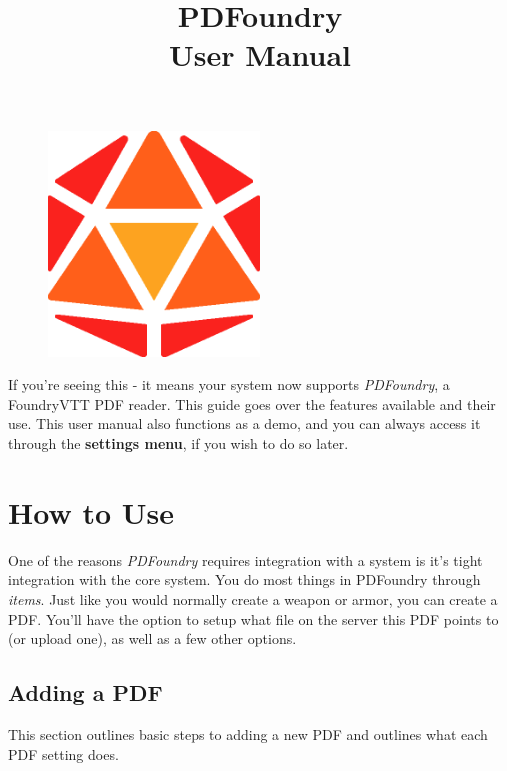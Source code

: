 \documentclass{article}
\title{%
PDFoundry \\
\large User Manual}
\date{}
\author{}
\begin{document}
    \begin{figure}[t]
        \centering
        \includegraphics[width=0.5\textwidth]{images/logo.png}
    \end{figure}
    \maketitle

    If you're seeing this - it means your system now supports \textit{PDFoundry}, a FoundryVTT PDF reader. This guide goes over the features available and their use. This user manual also functions as a demo, and you can always access it through the \textbf{settings menu}, if you wish to do so later.

    \tableofcontents

    \section{How to Use}
    One of the reasons \textit{PDFoundry} requires integration with a system is it's tight integration with the core system. You do most things in PDFoundry through \textit{items}. Just like you would normally create a weapon or armor, you can create a PDF. You'll have the option to setup what file on the server this PDF points to (or upload one), as well as a few other options.

    \subsection{Adding a PDF}
    This section outlines basic steps to adding a new PDF and outlines what each PDF setting does.
\end{document}
